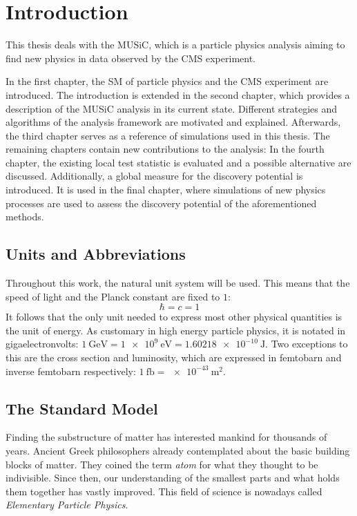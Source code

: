 
\chapter{Introduction}

This thesis deals with the \acf{MUSiC}, which is a particle physics analysis aiming to find new physics in data observed by the \acf{CMS} experiment.

In the first chapter, the \acl{SM} of particle physics and the \acs{CMS} experiment are introduced. 
The introduction is extended in the second chapter, which provides a description of the \acs{MUSiC} analysis in its current state. Different strategies and algorithms of the analysis framework are motivated and explained. Afterwards, the third chapter serves as a reference of simulations used in this thesis. The remaining chapters contain new contributions to the analysis: In the fourth chapter, the existing local test statistic \TS is evaluated and a possible alternative are discussed. Additionally, a global measure for the discovery potential is introduced. It is used in the final chapter, where simulations of new physics processes are used to assess the discovery potential of the aforementioned methods. 

\section{Units and Abbreviations}
Throughout this work, the natural unit system will be used. This means that the speed of light and the Planck constant are fixed to $1$:
\begin{equation*}
    \hbar = c = 1
\end{equation*}
It follows that the only unit needed to express most other physical quantities is the unit of energy. As customary in high energy particle physics, it is notated in gigaelectronvolts: $\SI{1}{\giga\eV} = \SI{1e9}{\eV} = \SI{1.60218e-10}{\joule}$.
Two exceptions to this are the cross section and luminosity, which are expressed in femtobarn and inverse femtobarn respectively: $\SI{1}{\femto\barn} = \SI{e-43}{\meter\squared}$.

\section{The Standard Model}
Finding the substructure of matter has interested mankind for thousands of years. Ancient Greek philosophers already contemplated about the basic building blocks of matter\cite{Melsen:atomosatomhistory}. They coined the term \emph{atom} for what they thought to be indivisible. Since then, our understanding of the smallest parts and what holds them together has vastly improved. This field of science is nowadays called \emph{Elementary Particle Physics}. 

